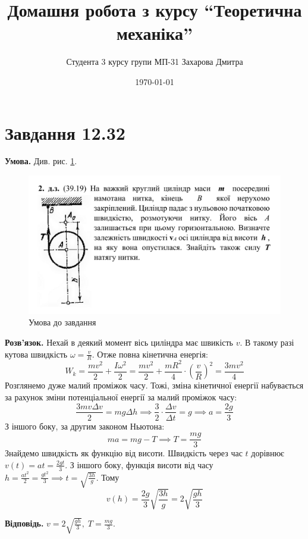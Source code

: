 \documentclass[14pt]{extarticle}
\title{Домашня робота з курсу ``Теоретична механіка''}
\author{Студента 3 курсу групи МП-31 Захарова Дмитра}
\date{\today}
\begin{document}
\maketitle
\section*{Завдання 12.32}

\textbf{Умова.} Див. рис. \ref{fig:1}.
\begin{figure}[H]
    \centering
    \includegraphics[width=\textwidth]{images/hw_12/problem.png}
    \caption{Умова до завдання}
    \label{fig:1}
\end{figure}
\pagebreak
\textbf{Розв'язок.} Нехай в деякий момент вісь циліндра має швикість $v$. В такому разі кутова швидкість $\omega=\frac{v}{R}$. Отже повна кінетична енергія:
\[
W_k = \frac{mv^2}{2} + \frac{I\omega^2}{2} = \frac{mv^2}{2} + \frac{mR^2}{4} \cdot \left(\frac{v}{R}\right)^2 = \frac{3mv^2}{4}
\]
Розглянемо дуже малий проміжок часу. Тожі, зміна кінетичної енергії набувається за рахунок зміни потенціальної енергії за малий проміжок часу:
\[
\frac{3mv \Delta v}{2} = mg \Delta h \implies \frac{3}{2} \cdot \frac{\Delta v}{\Delta t} = g \implies a = \frac{2g}{3}
\]
З іншого боку, за другим законом Ньютона:
\[
ma = mg - T \implies T = \frac{mg}{3}
\]
Знайдемо швидкість як функцію від висоти. Швидкість через час $t$ дорівнює $v(t)=at = \frac{2gt}{3}$. З іншого боку, функція висоти від часу $h = \frac{at^2}{2}=\frac{gt^2}{3} \implies t = \sqrt{\frac{3h}{g}}$. Тому
\[
v(h) = \frac{2g}{3}\sqrt{\frac{3h}{g}} = 2\sqrt{\frac{gh}{3}}
\]

\textbf{Відповідь.} $v = 2\sqrt{\frac{gh}{3}},\;T=\frac{mg}{3}$.
\end{document}

